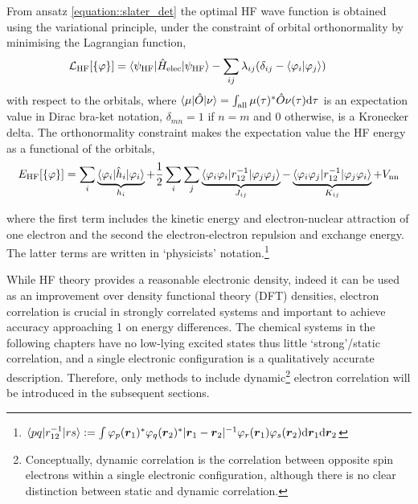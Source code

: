 \documentclass[main.tex]{subfiles}
\begin{document}
From ansatz \eqref{equation::slater_det} the optimal HF wave function is obtained using the variational principle,\cite{Echenique2007} under the constraint of orbital orthonormality by minimising the Lagrangian function,
\begin{equation}
\mathcal{L}_\text{HF}[\{\varphi\}] = \braket{\psi_\text{HF} | \hat{H}_\text{elec} | \psi_\text{HF}} - \sum_{ij}\lambda_{ij} (\delta_{ij} - \braket{\varphi_i | \varphi_j})  \qquad 
\end{equation}
with respect to the orbitals, where $\braket{\mu | \hat{O} | \nu} = \int_\text{all}\mu(\tau)^{*} \hat{O}\nu(\tau) \text{d}\tau$ is an expectation value in Dirac bra-ket notation, $\delta_{mn} = 1$ if $n = m$ and $0$ otherwise, is a Kronecker delta. The orthonormality constraint makes the expectation value the HF energy as a functional of the orbitals,
\begin{equation}
E_\text{HF}[\{\varphi\}] = \sum_i \underbrace{\braket{\varphi_i | \hat{h}_i | \varphi_i}}_{h_i} + \frac{1}{2}\sum_{i} \sum_{j} \underbrace{\braket{\varphi_i \varphi_i |r_{12}^{-1}|\varphi_j \varphi_j}}_{J_{ij}} -  \underbrace{\braket{\varphi_i \varphi_j |r_{12}^{-1}|\varphi_j \varphi_i}}_{K_{ij}} + V_\text{nn} 
\end{equation}

where the first term includes the kinetic energy and electron-nuclear attraction of one electron and the second the electron-electron repulsion and exchange energy. The latter terms are written in `physicists' notation.\footnote{$\braket{pq | r_{12}^{-1}| rs} := \int \varphi_p(\boldsymbol{r}_1)^*\varphi_q(\boldsymbol{r}_2)^* |\boldsymbol{r}_{1} - \boldsymbol{r}_{2}|^{-1} \varphi_r(\boldsymbol{r}_1)\varphi_s(\boldsymbol{r}_2)\text{d}\boldsymbol{r}_1 \text{d}\boldsymbol{r}_2$}

While HF theory provides a reasonable electronic density, indeed it can be used as an improvement over density functional theory (DFT) densities,\cite{Vuckovic2019} electron correlation is crucial in strongly correlated systems and important to achieve accuracy approaching 1 \kcalx on energy differences.\cite{Jensen2006} The chemical systems in the following chapters have no low-lying excited states thus little `strong'/static correlation, and a single electronic configuration is a qualitatively accurate description. Therefore, only methods to include dynamic\footnote{Conceptually, dynamic correlation is the correlation between opposite spin electrons within a single electronic configuration, although there is no clear distinction between static and dynamic correlation.} electron correlation will be introduced in the subsequent sections.
\end{document}
